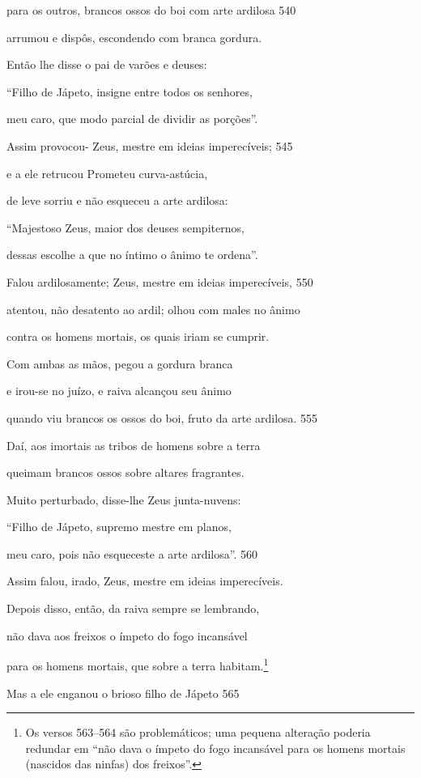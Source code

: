 para os outros, brancos ossos do boi com arte ardilosa \num{540}

arrumou e dispôs, escondendo com branca gordura.

\quad{}Então lhe disse o pai de varões e deuses:

``Filho de Jápeto, insigne entre todos os senhores,

meu caro, que modo parcial de dividir as porções''.

\quad{}Assim provocou- Zeus, mestre em ideias imperecíveis; \num{545}

e a ele retrucou Prometeu curva-astúcia,

de leve sorriu e não esqueceu a arte ardilosa:

``Majestoso Zeus, maior dos deuses sempiternos,

dessas escolhe a que no íntimo o ânimo te ordena''.

\quad{}Falou ardilosamente; Zeus, mestre em ideias imperecíveis, \num{550}

atentou, não desatento ao ardil; olhou com males no ânimo

contra os homens mortais, os quais iriam se cumprir.

Com ambas as mãos, pegou a gordura branca

e irou-se no juízo, e raiva alcançou seu ânimo

quando viu brancos os ossos do boi, fruto da arte ardilosa. \num{555}

Daí, aos imortais as tribos de homens sobre a terra

queimam brancos ossos sobre altares fragrantes.

\quad{}Muito perturbado, disse-lhe Zeus junta-nuvens:

``Filho de Jápeto, supremo mestre em planos,

meu caro, pois não esqueceste a arte ardilosa''. \num{560}

\quad{}Assim falou, irado, Zeus, mestre em ideias imperecíveis.

Depois disso, então, da raiva sempre se lembrando,

não dava aos freixos o ímpeto do fogo incansável

para os homens mortais, que sobre a terra habitam.\footnote{Os versos 563--564 são problemáticos; uma pequena alteração poderia redundar em
``não dava o ímpeto do fogo incansável para os homens mortais (nascidos
das ninfas) dos freixos''.}

Mas a ele enganou o brioso filho de Jápeto \num{565}

